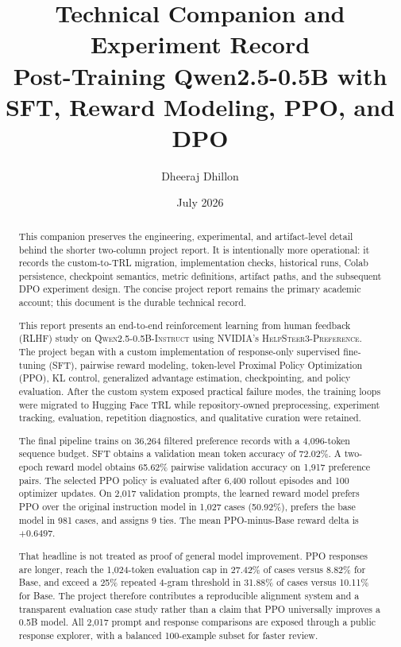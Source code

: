 \documentclass[11pt]{article}
\title{
  \vspace{-1.5cm}
  \textbf{Technical Companion and Experiment Record}\\
  \large Post-Training Qwen2.5-0.5B with SFT, Reward Modeling, PPO, and DPO
}
\author{Dheeraj Dhillon}
\date{July 2026}
\newcommand{\model}{\textsc{Qwen2.5-0.5B-Instruct}}
\newcommand{\dataset}{\textsc{HelpSteer3-Preference}}
\newcommand{\trl}{\textsc{TRL}}
\begin{document}
\maketitle

\begin{abstract}
This companion preserves the engineering, experimental, and artifact-level
detail behind the shorter two-column project report. It is intentionally more
operational: it records the custom-to-TRL migration, implementation checks,
historical runs, Colab persistence, checkpoint semantics, metric definitions,
artifact paths, and the subsequent DPO experiment design. The concise project
report remains the primary academic account; this document is the durable
technical record.

This report presents an end-to-end reinforcement learning from human feedback
(RLHF) study on \model{} using NVIDIA's \dataset{}. The project began with a
custom implementation of response-only supervised fine-tuning (SFT), pairwise
reward modeling, token-level Proximal Policy Optimization (PPO), KL control,
generalized advantage estimation, checkpointing, and policy evaluation. After
the custom system exposed practical failure modes, the training loops were
migrated to Hugging Face \trl{} while repository-owned preprocessing,
experiment tracking, evaluation, repetition diagnostics, and qualitative
curation were retained.

The final pipeline trains on 36,264 filtered preference records with a
4,096-token sequence budget. SFT obtains a validation mean token accuracy of
72.02\%. A two-epoch reward model obtains 65.62\% pairwise validation accuracy
on 1,917 preference pairs. The selected PPO policy is evaluated after 6,400
rollout episodes and 100 optimizer updates. On 2,017 validation prompts, the
learned reward model prefers PPO over the original instruction model in 1,027
cases (50.92\%), prefers the base model in 981 cases, and assigns 9 ties. The
mean PPO-minus-Base reward delta is $+0.6497$.

That headline is not treated as proof of general model improvement. PPO
responses are longer, reach the 1,024-token evaluation cap in 27.42\% of cases
versus 8.82\% for Base, and exceed a 25\% repeated 4-gram threshold in 31.88\%
of cases versus 10.11\% for Base. The project therefore contributes a
reproducible alignment system and a transparent evaluation case study rather
than a claim that PPO universally improves a 0.5B model. All 2,017 prompt and
response comparisons are exposed through a public response explorer, with a
balanced 100-example subset for faster review.
\end{abstract}
\end{document}
